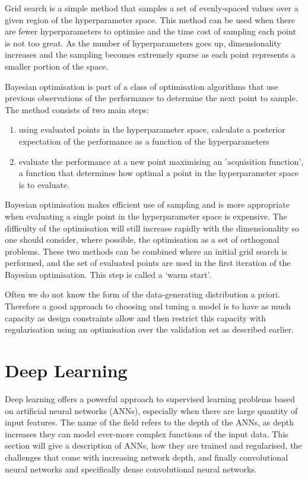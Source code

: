 Grid search is a simple method that samples a set of evenly-spaced values over a given region of the hyperparameter space. 
This method can be used when there are fewer hyperparameters to optimise and the time cost of sampling each point is not too great. 
As the number of hyperparameters goes up, dimensionality increases and the sampling becomes extremely sparse as each point represents a smaller portion of the space.

Bayesian optimisation \cite{BayesOpt} is part of a class of optimisation algorithms that use previous observations of the performance to determine the next point to sample. 
The method consists of two main steps:
\begin{enumerate}[noitemsep]
    \item using evaluated points in the hyperparameter space, calculate a posterior expectation of the performance as a function of the hyperparameters
    \item evaluate the performance at a new point maximising an 'acquisition function', a function that determines how optimal a point in the hyperparameter space is to evaluate. 
\end{enumerate}
Bayesian optimisation makes efficient use of sampling and is more appropriate when evaluating a single point in the hyperparameter space is expensive. The difficulty of the optimisation will still increase rapidly with the dimensionality so one should consider, where possible, the optimisation as a set of orthogonal problems.  
These two methods can be combined where an initial grid search is performed, and the set of evaluated points are used in the first iteration of the Bayesian optimisation. 
This step is called a `warm start'. 

Often we do not know the form of the data-generating distribution a priori. Therefore a good approach to choosing and tuning a model is to have as much capacity as design constraints allow and then restrict this capacity with regularisation using an optimisation over the validation set as described earlier.

\section{Deep Learning}

Deep learning offers a powerful approach to supervised learning problems based on artificial neural networks (ANNs), especially when there are large quantity of input features. 
The name of the field refers to the depth of the ANNs, as depth increases they can model ever-more complex functions of the input data. 
This section will give a description of ANNs, how they are trained and regularised, the challenges that come with increasing network depth, and finally convolutional neural networks and specifically dense convolutional neural networks.  

